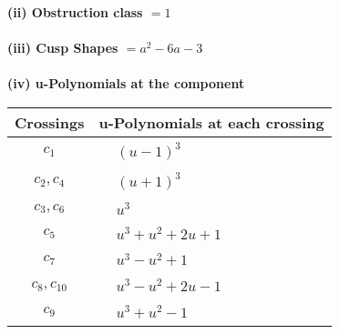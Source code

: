 \documentclass[1p]{elsarticle_modified}
\theoremstyle{definition}
\begin{document}
\flushleft \textbf{(ii) Obstruction class $= 1$}\\~\\
\flushleft \textbf{(iii) Cusp Shapes $= a^2-6 a-3$}\\~\\
\newpage\renewcommand{\arraystretch}{1}
\flushleft \textbf{(iv) u-Polynomials at the component}\newline \\
\begin{tabular}{m{50pt}|m{274pt}}
Crossings & \hspace{64pt}u-Polynomials at each crossing \\
\hline $$\begin{aligned}c_{1}\end{aligned}$$&$\begin{aligned}
&(u-1)^3
\end{aligned}$\\
\hline $$\begin{aligned}c_{2},c_{4}\end{aligned}$$&$\begin{aligned}
&(u+1)^3
\end{aligned}$\\
\hline $$\begin{aligned}c_{3},c_{6}\end{aligned}$$&$\begin{aligned}
&u^3
\end{aligned}$\\
\hline $$\begin{aligned}c_{5}\end{aligned}$$&$\begin{aligned}
&u^3+u^2+2 u+1
\end{aligned}$\\
\hline $$\begin{aligned}c_{7}\end{aligned}$$&$\begin{aligned}
&u^3- u^2+1
\end{aligned}$\\
\hline $$\begin{aligned}c_{8},c_{10}\end{aligned}$$&$\begin{aligned}
&u^3- u^2+2 u-1
\end{aligned}$\\
\hline $$\begin{aligned}c_{9}\end{aligned}$$&$\begin{aligned}
&u^3+u^2-1
\end{aligned}$\\
\hline
\end{tabular}\\~\\
\end{document}

